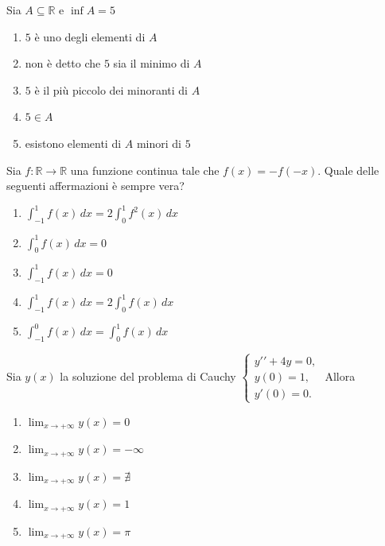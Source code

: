 \begin{quiz}
Sia $A\subseteq\mathbb R$ e $\inf A=5$
\begin{enumerate}
\item $5$ \`e uno degli elementi di $A$
\item non \`e detto che $5$ sia il minimo di $A$
\item $5$ \`e il pi\`u piccolo dei minoranti di $A$
\item $5\in A$
\item esistono elementi di $A$ minori di $5$
\end{enumerate}
\end{quiz}

\begin{quiz}
Sia $f:\mathbb R\to\mathbb R$ una funzione continua tale che $f(x)=-f(-x)$. Quale delle seguenti affermazioni \`e sempre vera?
\begin{enumerate}
\item $\displaystyle\int_{-1}^{1}f(x)\,dx=2\int_0^1f^2(x)\,dx$
\item $\displaystyle\int_0^1f(x)\,dx=0$
\item $\displaystyle\int_{-1}^1f(x)\,dx=0$
\item $\displaystyle\int_{-1}^1f(x)\,dx=2\int_0^1f(x)\,dx$
\item $\displaystyle\int_{-1}^0f(x)\,dx=\int_0^1f(x)\,dx$
\end{enumerate}
\end{quiz}

\begin{quiz}
Sia $y(x)$ la soluzione del problema di Cauchy $\begin{cases}y\prime\prime+4y=0,\\y(0)=1,\\y\prime(0)=0.\end{cases}$ Allora
\begin{enumerate}
\item $\displaystyle\lim_{x\to+\infty}y(x)=0$
\item $\displaystyle\lim_{x\to+\infty}y(x)=-\infty$
\item $\displaystyle\lim_{x\to+\infty}y(x)=\nexists$
\item $\displaystyle\lim_{x\to+\infty}y(x)=1$
\item $\displaystyle\lim_{x\to+\infty}y(x)=\pi$
\end{enumerate}
\end{quiz}

